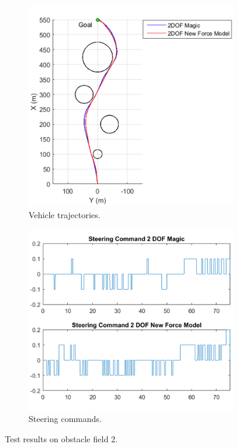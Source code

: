 \documentclass[12pt,onecolumn]{report}
\begin{document}
\begin{figure}
	\centering
	\begin{subfigure}[b]{0.49\columnwidth}
		\centering
		\includegraphics[height=\columnwidth]{Figs/Field2MagicvBekkerTrajectories_cropped.png}
		\caption{{\small Vehicle trajectories.}}   
		\label{fig:ObstacleField2TrajectoriesExp2}
	\end{subfigure}
	\hfill
	\begin{subfigure}[b]{0.49\columnwidth}
		\centering
		\includegraphics[width=\columnwidth]{Figs/Field2MagicvBekkerSteeringCommands_cropped.png}
		\caption{\small Steering commands.}   
		\label{fig:SteeringCommandsField2Exp2}
	\end{subfigure}
	\caption{\small Test results on obstacle field 2.}
	\label{fig:Obst2TestDataExp2}
\end{figure}
\end{document}
